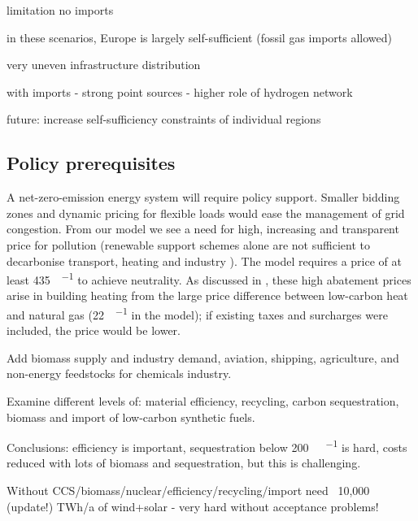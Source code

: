 limitation no imports

in these scenarios, Europe is largely self-sufficient (fossil gas imports allowed)

very uneven infrastructure distribution

with imports
- strong point sources
- higher role of hydrogen network

future: increase self-sufficiency constraints of individual regions

\subsection*{Policy prerequisites}

A net-zero-emission energy system will require policy support.
Smaller bidding zones and dynamic pricing for flexible loads would
ease the management of grid congestion. From our model we see a need
for high, increasing and transparent price for \co pollution
(renewable support schemes alone are not sufficient to decarbonise
transport, heating and industry \cite{zhuImpactCO22018}). The model requires
a \co price of at least \SI{435}{\sieuro\per\tco} to achieve \co
neutrality. As discussed in \cite{brownSynergiesSector2018}, these high abatement
prices arise in building heating from the large price difference
between low-carbon heat and natural gas (\SI{22}{\sieuro\per\mwh} in the model);
if existing taxes and surcharges were included, the \co price would
be lower.



Add biomass supply and industry demand, aviation, shipping, agriculture, and non-energy
feedstocks for chemicals industry.

Examine different levels of: material efficiency, recycling, carbon
sequestration, biomass and import of low-carbon synthetic fuels.

Conclusions: efficiency is important, sequestration below \SI{200}{\mega\tco\per\year} is hard,
costs reduced with lots of biomass and sequestration, but this is challenging.

Without CCS/biomass/nuclear/efficiency/recycling/import need ~10,000 (update!) TWh/a of
wind+solar - very hard without acceptance problems!